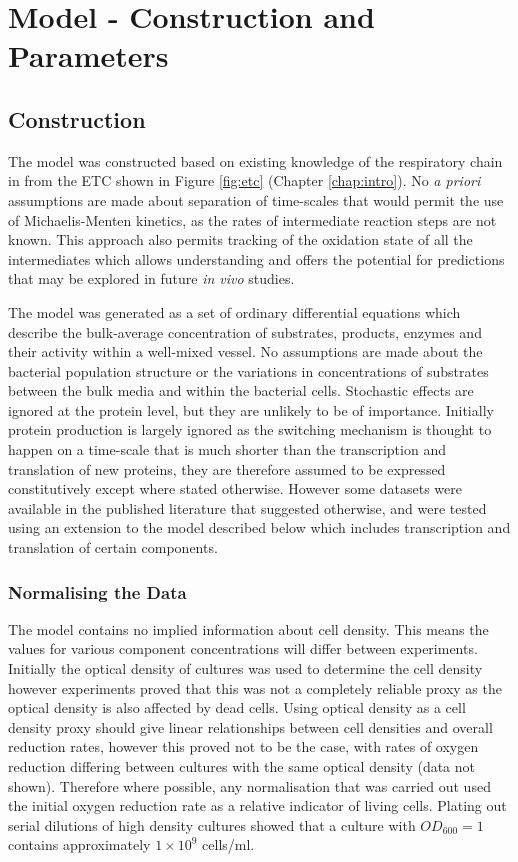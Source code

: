 \chapter{Model - Construction and Parameters}
\label{chap:model}
\section{Construction}

The model was constructed based on existing knowledge of the respiratory chain in \Nsm{} from the ETC shown in Figure \ref{fig:etc} (Chapter \ref{chap:intro}). No \textit{a priori} assumptions are made about separation of time-scales that would permit the use of Michaelis-Menten kinetics, as the rates of intermediate reaction steps are not known. This approach also permits tracking of the oxidation state of all the intermediates which allows understanding and offers the potential for predictions that may be explored in future \textit{in vivo} studies.

The model was generated as a set of ordinary differential equations which describe the bulk-average concentration of substrates, products, enzymes and their activity within a well-mixed vessel. No assumptions are made about the bacterial population structure or the variations in concentrations of substrates between the bulk media and within the bacterial cells. Stochastic effects are ignored at the protein level, but they are unlikely to be of importance. Initially protein production is largely ignored as the switching mechanism is thought to happen on a time-scale that is much shorter than the transcription and translation of new proteins, they are therefore assumed to be expressed constitutively except where stated otherwise. However some datasets were available in the published literature\cite{Rock2005} that suggested otherwise, and were tested using an extension to the model described below which includes transcription and translation of certain components.

\subsection{Normalising the Data}
The model contains no implied information about cell density. This means the values for various component concentrations will differ between experiments.
Initially the optical density of cultures was used to determine the cell density however experiments proved that this was not a completely reliable proxy as the optical density is also affected by dead cells. Using optical density as a cell density proxy should give linear relationships between cell densities and overall reduction rates, however this proved not to be the case, with rates of oxygen reduction differing between cultures with the same optical density (data not shown). Therefore where possible, any normalisation that was carried out used the initial oxygen reduction rate as a relative indicator of living cells. Plating out serial dilutions of high density cultures showed that a culture with $OD_{600} = 1$ contains approximately $1 \times 10^9$ cells/ml.


